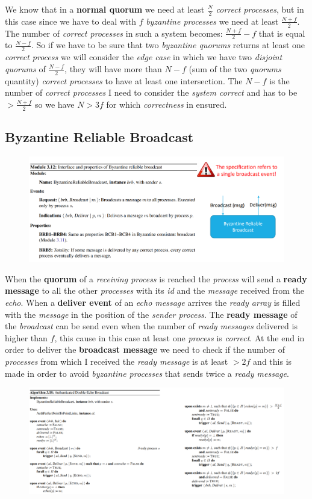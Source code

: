 \documentclass{article}
\begin{document}
We know that in a \textbf{normal quorum} we need at least $\frac{N}{2}$ \emph{correct processes}, but in this case since we have to deal with $f$ \emph{byzantine processes} we need at least $\frac{N+f}{2}$. The number of \emph{correct processes} in such a system becomes: $\frac{N+f}{2} - f$ that is equal to $\frac{N-f}{2}$. So if we have to be sure that two \emph{byzantine quorums} returns at least one \emph{correct process} we will consider the \emph{edge case }in which we have two \emph{disjoint quorums} of $\frac{N-f}{2}$, they will have more than $N-f$ (sum of the two \emph{quorums} quantity) \emph{correct processes} to have at least one intersection. The $N-f$ is the number of \emph{correct processes} I need to consider the \emph{system correct} and has to be $> \frac{N+f}{2}$ so we have $N>3f$ for which \emph{correctness} in ensured.
\subsection{Byzantine Reliable Broadcast}
\begin{figure}[H]
  \centering
  \includegraphics[scale=0.6,left]{cattura82.png}
\end{figure}
When the \textbf{quorum} of a \emph{receiving process} is reached the \emph{process} will send a \textbf{ready message} to all the other \emph{processes} with its \emph{id} and the \emph{message} received from the \emph{echo}. When a \textbf{deliver event} of an \emph{echo message} arrives the \emph{ready array} is filled with the \emph{message} in the position of the \emph{sender process}. The \textbf{ready message} of the \emph{broadcast} can be send even when the number of \emph{ready messages} delivered is higher than $f$, this cause in this case at least one \emph{process} is \emph{correct}. At the end in order to deliver the \textbf{broadcast message} we need to check if the number of \emph{processes} from which I received the \emph{ready message} is at least $>2f$ and this is made in order to avoid \emph{byzantine processes} that sends twice a \emph{ready message}.
\begin{figure}[H]
  \centering
  \includegraphics[scale=0.9,left]{cattura83.png}
\end{figure}
\end{document}
